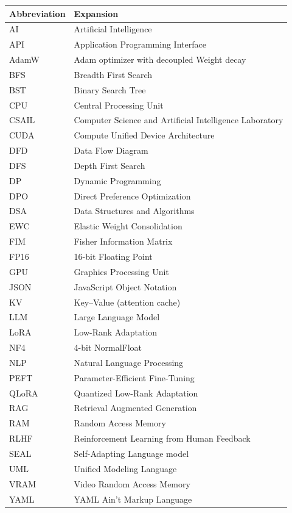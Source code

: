 \documentclass[12pt,a4paper]{report}
\begin{document}
\begin{longtable}{>{\raggedright\arraybackslash}p{3cm} p{10cm}}
\toprule
\textbf{Abbreviation} & \textbf{Expansion} \\
\midrule
\endhead
AI & Artificial Intelligence \\
API & Application Programming Interface \\
AdamW & Adam optimizer with decoupled Weight decay \\
BFS & Breadth First Search \\
BST & Binary Search Tree \\
CPU & Central Processing Unit \\
CSAIL & Computer Science and Artificial Intelligence Laboratory \\
CUDA & Compute Unified Device Architecture \\
DFD & Data Flow Diagram \\
DFS & Depth First Search \\
DP & Dynamic Programming \\
DPO & Direct Preference Optimization \\
DSA & Data Structures and Algorithms \\
EWC & Elastic Weight Consolidation \\
FIM & Fisher Information Matrix \\
FP16 & 16-bit Floating Point \\
GPU & Graphics Processing Unit \\
JSON & JavaScript Object Notation \\
KV & Key--Value (attention cache) \\
LLM & Large Language Model \\
LoRA & Low-Rank Adaptation \\
NF4 & 4-bit NormalFloat \\
NLP & Natural Language Processing \\
PEFT & Parameter-Efficient Fine-Tuning \\
QLoRA & Quantized Low-Rank Adaptation \\
RAG & Retrieval Augmented Generation \\
RAM & Random Access Memory \\
RLHF & Reinforcement Learning from Human Feedback \\
SEAL & Self-Adapting Language model \\
UML & Unified Modeling Language \\
VRAM & Video Random Access Memory \\
YAML & YAML Ain't Markup Language \\
\bottomrule
\end{longtable}
\endgroup
\end{document}
